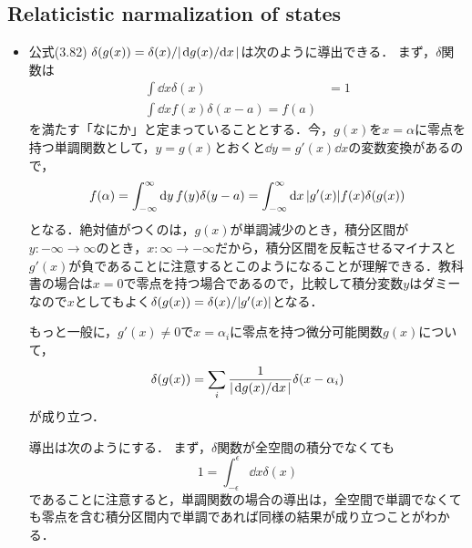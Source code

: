 \subsection{Relaticistic narmalization of states}
\begin{itemize}
	\item 公式(3.82) $\delta(g(x)) = \delta(x) / \abs{\dv*{g(x)}{x}}$は次のように導出できる．
		まず，$\delta$関数は
		\begin{align}
			\int \dd{x}\delta(x) &= 1\\
			\int \dd{x} f(x) \delta(x-a) = f(a)
		\end{align}
		を満たす「なにか」と定まっていることとする．今，$g(x)$を$x = \alpha$に零点を持つ単調関数として，$y = g(x)$とおくと$\dd{y} = g'(x)\dd{x}$の変数変換があるので，
		\begin{equation}
			f(\alpha) = \int_{-\infty}^{\infty}\dd{y}f(y)\delta(y-a) = \int_{-\infty}^{\infty}\dd{x}\abs{g'(x)}f(x)\delta(g(x))
		\end{equation}
		となる．絶対値がつくのは，$g(x)$が単調減少のとき，積分区間が$y\colon-\infty \to \infty$のとき，$x\colon \infty \to -\infty$だから，積分区間を反転させるマイナスと$g'(x)$が負であることに注意するとこのようになることが理解できる．教科書の場合は$x=0$で零点を持つ場合であるので，比較して積分変数$y$はダミーなので$x$としてもよく$\delta(g(x)) = \delta(x)/\abs{g'(x)}$となる．
		
		もっと一般に，$g'(x)\neq0$で$x = \alpha_i$に零点を持つ微分可能関数$g(x)$について，
		\begin{equation}
			\delta(g(x)) = \sum_i\frac{1}{\abs{\dv*{g(x)}{x}}}\delta(x-\alpha_i)
		\end{equation}
		が成り立つ．

		導出は次のようにする．
		まず，$\delta$関数が全空間の積分でなくても
		\begin{equation}
			1 = \int_{-\epsilon}^{\epsilon}\dd{x}\delta(x)
		\end{equation}
		であることに注意すると，単調関数の場合の導出は，全空間で単調でなくても零点を含む積分区間内で単調であれば同様の結果が成り立つことがわかる．


\end{itemize}
